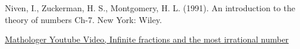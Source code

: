 \documentclass[psamsfonts]{amsart}
\theoremstyle{definition}
\theoremstyle{remark}
\numberwithin{equation}{section}
\begin{document}
\begin{thebibliography}{9}

Niven, I., 
Zuckerman, H. S., 
Montgomery, H. L. (1991).
An introduction to the theory of numbers Ch-7. New York: Wiley.


 \href{https://www.youtube.com/watch?v=CaasbfdJdJg&t=80s&ab_channel=Mathologer}{Mathologer Youtube Video, Infinite fractions and the most irrational number}

\end{thebibliography}
\end{document}
